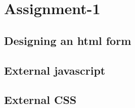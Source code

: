 \documentclass[a4paper,16pt]{article}
\begin{document}
	{
		\doublespacing
		{
			\renewcommand\contentsname{\Huge Contents}
			\renewcommand\cftsecfont{\LARGE}
			
			\renewcommand\cftsubsecfont{\Large}
			
			\doublespacing
			\tableofcontents
			\doublespacing
		}
	}
	\newpage
	\section{Assignment-1}
	\subsection{Designing an html form}
	\vspace{0.2in}
	
	\subsection{External javascript}
	\vspace{0.2in}
	
	\vspace{0.2in}
	\subsection{External CSS}
	
\end{document}
